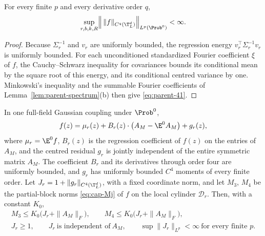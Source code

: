 \begin{lemma}\label{lem:parent-moments}
For every finite $p$ and every derivative order $q$,
\begin{equation}\label{eq:parent-41}
\sup_{r,b,k,R}\Bigl\|\,\|f\|_{C^q(\T^d_L)}\Bigr\|_{L^p(\Prob^0)}<\infty .
\end{equation}
\end{lemma}

\begin{proof}
Because $\Sigma_r^{-1}$ and $v_r$ are uniformly bounded, the regression energy $v_r^{\top}\Sigma_r^{-1}v_r$ is uniformly bounded. For each unconditioned standardized Fourier coefficient $\xi$ of $f$, the Cauchy--Schwarz inequality for covariances bounds its conditional mean by the square root of this energy, and its conditional centred variance by one. Minkowski's inequality and the summable Fourier coefficients of Lemma~\ref{lem:parent-spectrum}(b) then give \eqref{eq:parent-41}.
\end{proof}

\begin{lemma}\label{lem:parent-residual}
In one full-field Gaussian coupling under $\Prob^0$,
\begin{equation}\label{eq:parent-42}
f(z)=\mu_r(z)+B_r(z)\cdot\bigl(A_M-\E^0A_M\bigr)+g_r(z),
\end{equation}
where $\mu_r=\E^0f$, $B_r(z)$ is the regression coefficient of $f(z)$ on the entries of $A_M$, and the centred residual $g_r$ is jointly independent of the entire symmetric matrix $A_M$. The coefficient $B_r$ and its derivatives through order four are uniformly bounded, and $g_r$ has uniformly bounded $C^4$ moments of every finite order. Let $J_r=1+\|g_r\|_{C^4(\T^d_L)}$, with a fixed coordinate norm, and let $M_3$, $M_4$ be the partial-block norms \eqref{eq:cap-Mj} of $f$ on the local cylinder $\mathcal D_r$. Then, with a constant $K_0$,
\begin{equation}\label{eq:parent-43}
\begin{gathered}
M_3\le K_0\bigl(J_r+\|A_M\|_F\bigr),\qquad M_4\le K_0\bigl(J_r+\|A_M\|_F\bigr),\\
J_r\ge1,\qquad J_r\ \text{is independent of}\ A_M,\qquad \sup\|J_r\|_{L^p}<\infty\ \text{for every finite }p .
\end{gathered}
\end{equation}
\end{lemma}

